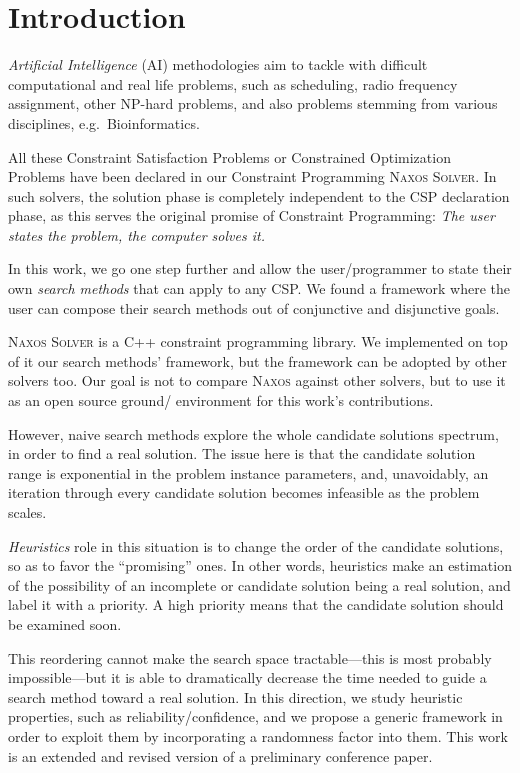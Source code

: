 \documentclass{ws-ijait}
\begin{document}


\section{Introduction}

\emph{Artificial Intelligence} (AI) methodologies aim to
tackle with difficult computational and real life problems,
such as scheduling,\cite{Pinedo2012} radio frequency
assignment,\cite{Cabon1999} other NP-hard problems, and also
problems stemming from various disciplines, e.g.\ 
Bioinformatics.\cite{Barahona2011}

All these Constraint Satisfaction Problems or Constrained
Optimization Problems have been declared in our Constraint
Programming \textsc{Naxos Solver}.\cite{Naxos} In such
solvers, the solution phase is completely independent to the
CSP declaration phase, as this serves the original promise
of Constraint Programming: \emph{The user states the
problem, the computer solves it.}\cite{Freuder2014}

In this work, we go one step further and allow the
user\slash programmer to state their own \emph{search
methods} that can apply to any CSP. We found a framework
where the user can compose their search methods out of
conjunctive and disjunctive goals.

\textsc{Naxos Solver} is a C++ constraint programming
library. We implemented on top of it our search methods'
framework, but the framework can be adopted by other solvers
too. Our goal is not to compare \textsc{Naxos} against other
solvers, but to use it as an open source ground\slash
environment for this work's contributions.

However, naive search methods explore the whole candidate
solutions spectrum, in order to find a real solution. The
issue here is that the candidate solution range is
exponential in the problem instance parameters, and,
unavoidably, an iteration through every candidate solution
becomes infeasible as the problem scales.

\emph{Heuristics} role in this situation is to change the
order of the candidate solutions, so as to favor the
``promising'' ones. In other words, heuristics make an
estimation of the possibility of an incomplete or candidate
solution being a real solution, and label it with a
priority. A high priority means that the candidate solution
should be examined soon.

This reordering cannot make the search space
tractable---this is most probably
impossible\cite{Fortnow2009}---but it is able to
dramatically decrease the time needed to guide a search
method toward a real solution. In this direction, we study
heuristic properties, such as reliability\slash confidence,
and we propose a generic framework in order to exploit them
by incorporating a randomness factor into them. This work is
an extended and revised version of a preliminary conference
paper.\cite{Pothitos2016-PoPS}
\end{document}

